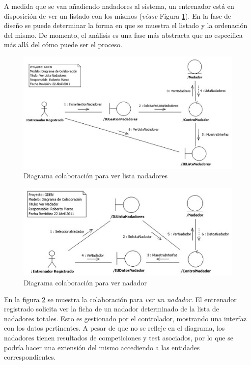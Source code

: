 		A medida que se van añadiendo nadadores al sistema, un entrenador está en disposición de ver un listado con los mismos ({\it véase} Figura \ref{fig:col_ver_lista_nadadores}). En la fase de diseño se puede determinar la forma en que se muestra el listado y la ordenación del mismo. De momento, el análisis es una fase más abstracta que no especifica más allá del cómo puede ser el proceso.
			
			\begin{figure}[H]
			  \centering
			    \includegraphics[width=16cm]{./eps/colaboraciones/gestion_nadadores/VerListaNadadores.eps}
			  \caption{Diagrama colaboración para ver lista nadadores}
			  \label{fig:col_ver_lista_nadadores}
			\end{figure}
			
		\newpage
			
			\begin{figure}[H]
			  \centering
			    \includegraphics[width=16cm]{./eps/colaboraciones/gestion_nadadores/VerNadador.eps}
			  \caption{Diagrama colaboración para ver nadador}
			  \label{fig:col_ver_nadador}
			\end{figure}
			
		En la figura \ref{fig:col_ver_nadador} se muestra la colaboración para {\it ver un nadador}. El entrenador registrado solicita ver la ficha de un nadador determinado de la lista de nadadores totales. Esto es gestionado por el controlador, mostrando una interfaz con los datos pertinentes. A pesar de que no se refleje en el diagrama, los nadadores tienen resultados de competiciones y test asociados, por lo que se podría hacer una extensión del mismo accediendo a las entidades correspondientes.
		
